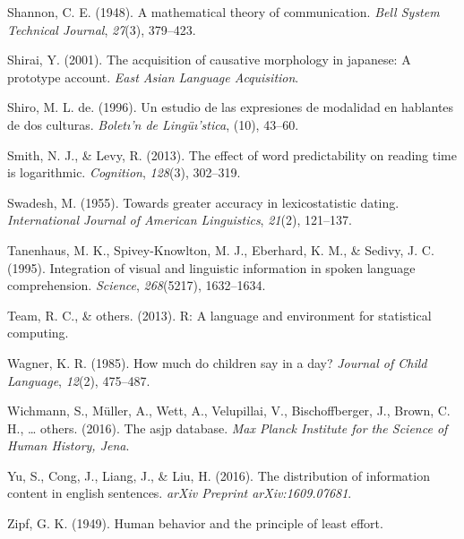 \documentclass[man,floatsintext]{apa6}
\begin{document}
\leavevmode\hypertarget{ref-shannon1948}{}%
Shannon, C. E. (1948). A mathematical theory of communication. \emph{Bell System Technical Journal}, \emph{27}(3), 379--423.

\leavevmode\hypertarget{ref-shirai2001}{}%
Shirai, Y. (2001). The acquisition of causative morphology in japanese: A prototype account. \emph{East Asian Language Acquisition}.

\leavevmode\hypertarget{ref-shiro1996}{}%
Shiro, M. L. de. (1996). Un estudio de las expresiones de modalidad en hablantes de dos culturas. \emph{Boletı'n de Lingüı'stica}, (10), 43--60.

\leavevmode\hypertarget{ref-smith2013}{}%
Smith, N. J., \& Levy, R. (2013). The effect of word predictability on reading time is logarithmic. \emph{Cognition}, \emph{128}(3), 302--319.

\leavevmode\hypertarget{ref-swadesh1955}{}%
Swadesh, M. (1955). Towards greater accuracy in lexicostatistic dating. \emph{International Journal of American Linguistics}, \emph{21}(2), 121--137.

\leavevmode\hypertarget{ref-tanenhaus1995}{}%
Tanenhaus, M. K., Spivey-Knowlton, M. J., Eberhard, K. M., \& Sedivy, J. C. (1995). Integration of visual and linguistic information in spoken language comprehension. \emph{Science}, \emph{268}(5217), 1632--1634.

\leavevmode\hypertarget{ref-team2013}{}%
Team, R. C., \& others. (2013). R: A language and environment for statistical computing.

\leavevmode\hypertarget{ref-wagner1985}{}%
Wagner, K. R. (1985). How much do children say in a day? \emph{Journal of Child Language}, \emph{12}(2), 475--487.

\leavevmode\hypertarget{ref-wichmann2016}{}%
Wichmann, S., Müller, A., Wett, A., Velupillai, V., Bischoffberger, J., Brown, C. H., \ldots{} others. (2016). The asjp database. \emph{Max Planck Institute for the Science of Human History, Jena}.

\leavevmode\hypertarget{ref-yu2016}{}%
Yu, S., Cong, J., Liang, J., \& Liu, H. (2016). The distribution of information content in english sentences. \emph{arXiv Preprint arXiv:1609.07681}.

\leavevmode\hypertarget{ref-zipf1949}{}%
Zipf, G. K. (1949). Human behavior and the principle of least effort.

\endgroup
\end{document}
